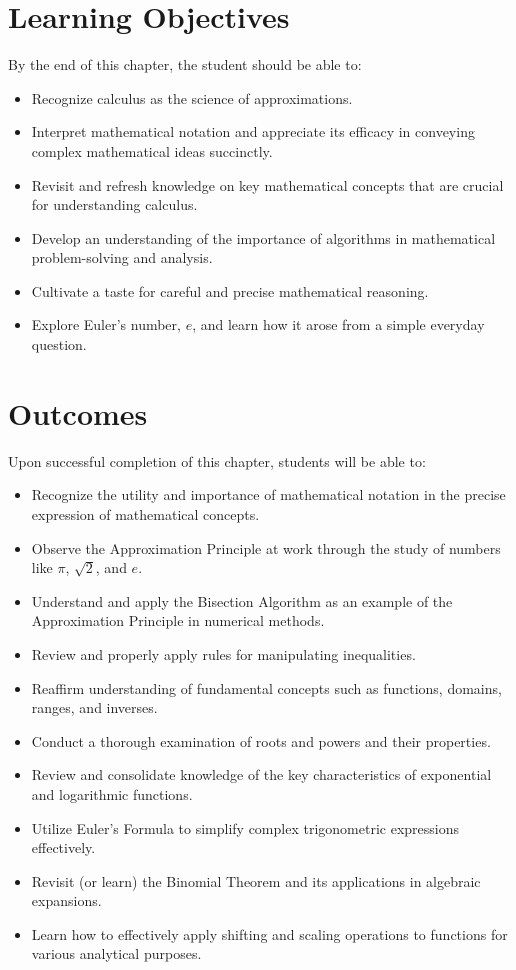 \section*{Learning Objectives}
By the end of this chapter, the student should be able to:
\begin{itemize}
    \item Recognize calculus as the science of approximations.
    \item Interpret mathematical notation and appreciate its efficacy in conveying complex mathematical ideas succinctly.
    \item Revisit and refresh knowledge on key mathematical concepts that are crucial for understanding calculus.
    \item Develop an understanding of the importance of algorithms in mathematical problem-solving and analysis.
    \item Cultivate a taste for careful and precise mathematical reasoning.
    \item Explore Euler's number,  \(e\), and learn how it arose from a simple everyday question.
\end{itemize}

\section*{Outcomes}
Upon successful completion of this chapter, students will be able to:
\begin{itemize}
    \item Recognize the utility and importance of mathematical notation in the precise expression of mathematical concepts.
    \item Observe the Approximation Principle at work through the study of numbers like \(\pi\), \(\sqrt{2}\), and \(e\).
    \item Understand and apply the Bisection Algorithm as an example of the Approximation Principle in numerical methods.
    \item Review and properly apply rules for manipulating inequalities.
    \item Reaffirm understanding of fundamental concepts such as functions, domains, ranges, and inverses.
    \item Conduct a thorough examination of roots and powers and their properties.
    \item Review and consolidate knowledge of the key characteristics of exponential and logarithmic functions.
    \item Utilize Euler's Formula to simplify complex trigonometric expressions effectively.
    \item Revisit (or learn) the Binomial Theorem and its applications in algebraic expansions.
    \item Learn how to effectively apply shifting and scaling operations to functions for various analytical purposes.
\end{itemize}

